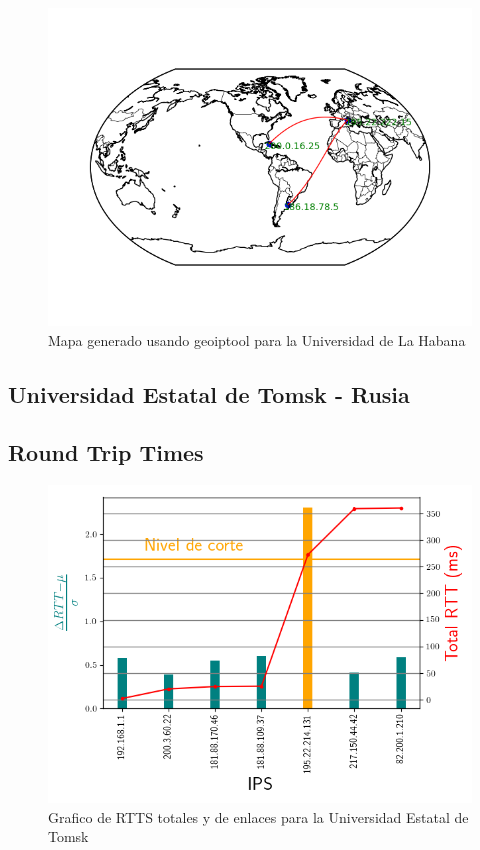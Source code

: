 \begin{figure}
	\centering
 	\includegraphics[scale=0.8]{imagenes/mapa_cuba_1.png}
 	\caption{Mapa generado usando geoiptool para la Universidad de La Habana}
\end{figure} 

\subsection{Universidad Estatal de Tomsk - Rusia}

\subsection{Round Trip Times}

\begin{figure}[ht]
	\begin{center}
		\includegraphics[width=0.8\columnwidth]{imagenes/rtts_tsu.png}
		\caption{Grafico de RTTS totales y de enlaces para la Universidad Estatal de Tomsk}
	\end{center}
\end{figure}

